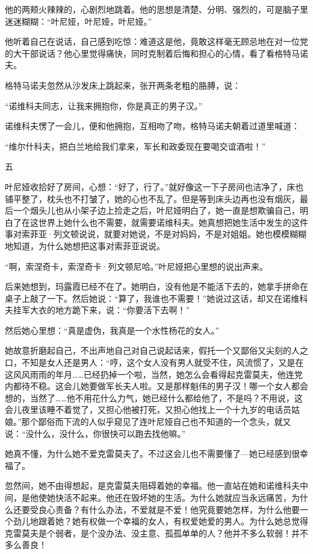 他的两颊火辣辣的，心剧烈地跳着。他的思想是清楚、分明、强烈的，可是脑子里迷迷糊糊：“叶尼娅，叶尼娅，叶尼娅。”

他听着自己在说话，自己感到吃惊：难道这是他，竟敢这样毫无顾忌地在对一位党的大干部说话？他心里觉得痛快，同时克制着后悔和担心的心情，看了看格特马诺夫。

格特马诺夫忽然从沙发床上跳起来，张开两条老粗的胳膊，说：

“诺维科夫同志，让我来拥抱你，你是真正的男子汉。”

诺维科夫愣了一会儿，便和他拥抱，互相吻了吻，格特马诺夫朝着过道里喊道：

“维尔什科夫，把白兰地给我们拿来，军长和政委现在要喝交谊酒啦！”

五

叶尼娅收拾好了房间，心想：“好了，行了。”就好像这一下子房间也洁净了，床也铺平整了，枕头也不打皱了，她的心也不乱了。但是等到床头边再也没有烟灰，最后一个烟头儿也从小架子边上捡走之后，叶尼娅明白了，她一直是想欺骗自己，明白了在这世界上她什么也不需要，就需要诺维科夫。她真想把她生活中发生的这件事对索菲亚·列文顿说说，就要对她说，不是对妈妈，不是对姐姐。她也模模糊糊地知道，为什么她想把这事对索菲亚说说。

“啊，索涅奇卡，索涅奇卡·列文顿尼哈。”叶尼娅把心里想的说出声来。

后来她想到，玛露霞已经不在了。她明白，没有他是不能活下去的，她拿手拼命在桌子上敲了一下。然后她说：“算了，我谁也不需要！”她说过这话，却又在诺维科夫挂军大衣的地方跪下来，说：“你要活下去啊！”

然后她心里想：“真是虚伪，我真是一个水性杨花的女人。”

她故意折磨起自己，不出声地自己对自己说起话来，假托一个又鄙俗又尖刻的人之口，不知是女人还是男人：“哼，这个女人没有男人就受不住，风流惯了，又是在这风风雨雨的年月……已经扔掉一个啦，当然，她怎么会看得起克雷莫夫，他连党内都待不稳。这会儿她要做军长夫人啦。又是那样魁伟的男子汉！哪一个女人都会想的，当然了……他不用花什么力气，她已经什么都给他了，不是吗？不用说，这会儿夜里该睡不着觉了，又担心他被打死，又担心他找上一个十九岁的电话员姑娘。”那个鄙俗而下流的人似乎窥见了连叶尼娅自己也不知道的一个念头，就又说：“没什么，没什么，你很快可以跑去找他嘛。”

她真不懂，为什么她不爱克雷莫夫了。不过这会儿也不需要懂了—她已经感到很幸福了。

忽然间，她不由得想起，是克雷莫夫阻碍着她的幸福。他一直站在她和诺维科夫中间，是他使她快活不起来。他还在毁坏她的生活。为什么她就应当永远痛苦，为什么还要受良心责备？有什么办法，不爱就是不爱！他究竟要她怎样，为什么他要一个劲儿地跟着她？她有权做一个幸福的女人，有权爱她爱的男人。为什么她总觉得克雷莫夫是个弱者，是个没办法、没主意、孤孤单单的人？他并不多么软弱！并不多么善良！

